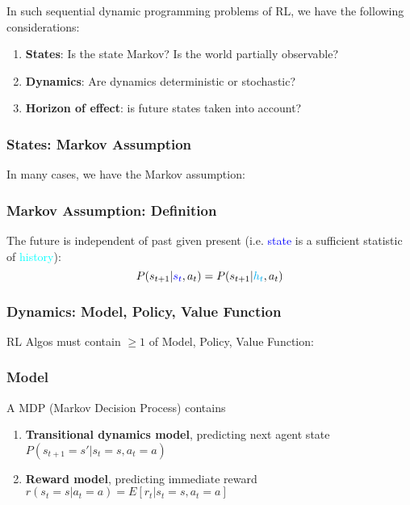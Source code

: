 \documentclass{article}
\begin{document}
In such sequential dynamic programming problems of RL, we have the following considerations:
\begin{enumerate}
\item \textbf{States}: Is the state Markov? Is the world partially observable?
\item \textbf{Dynamics}: Are dynamics deterministic or stochastic?
\item \textbf{Horizon of effect}: is future states taken into account?
\end{enumerate}

\subsubsection{States: Markov Assumption}
In many cases, we have the Markov assumption:
\begin{thmbox}
  \subsubsection*{Markov Assumption: Definition}
  The future is independent of past given present (i.e. \textcolor{blue}{state} is a sufficient statistic of \textcolor{cyan}{history}):
  \begin{equation*}
    P(s_{t+1} | \textcolor{blue}{s_t}, a_t ) = P(s_{t+1} | \textcolor{cyan}{h_t}, a_t )
  \end{equation*}
\end{thmbox}

\subsubsection{Dynamics: Model, Policy, Value Function}
RL Algos must contain $\ge1$ of {Model, Policy, Value Function}:

\subsubsection*{Model}
A MDP (Markov Decision Process) contains
\begin{enumerate}
\item \textbf{Transitional dynamics model}, predicting next agent state
    $P(s_{t+1} = s' | s_t = s, a_t = a)$
\item \textbf{Reward model}, predicting immediate reward 
    $r(s_t = s | a_t = a) = E[ r_t | s_t = s, a_t = a]$
\end{enumerate}
\end{document}
